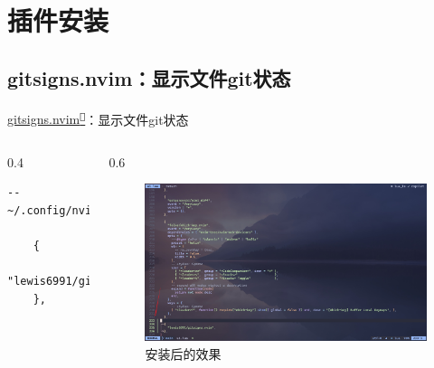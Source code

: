\documentclass[aspectratio=169]{ctexbeamer}
\newcommand{\nerd}[1]{\texttt{#1}}
\newcommand{\link}[3][]{\href{#3}{#2\textsuperscript{\nerd{}}}}
\begin{document}
\section{插件安装}

\subsection{gitsigns.nvim：显示文件git状态}
\begin{frame}[fragile]{\link{gitsigns.nvim}{https://github.com/lewis6991/gitsigns.nvim}：显示文件git状态}
  \begin{columns}
    \begin{column}{0.4\linewidth}
          \begin{lstlisting}[basicstyle=\tiny\ttfamily]
    -- ~/.config/nvim/lua/plugins/ui.lua

    {
      "lewis6991/gitsigns.nvim",
    },
        \end{lstlisting}
    \end{column}

    \begin{column}{0.6\linewidth}
      \begin{figure}[H]
        \centering
        \includegraphics[width=\linewidth]{./Figures/Gitsigns_Finish.jpg}
        \caption{安装后的效果}%
      \end{figure}
    \end{column}
  \end{columns}
\end{frame}
\end{document}
